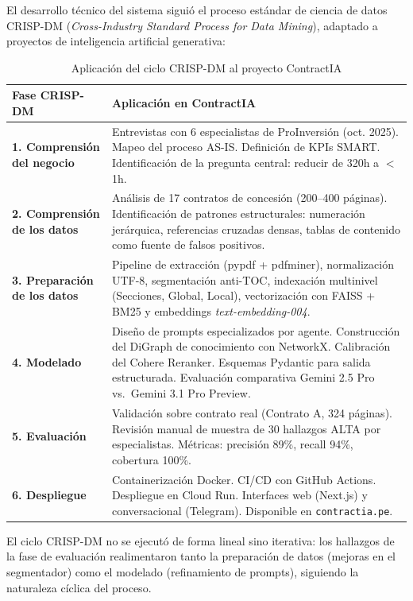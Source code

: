 El desarrollo técnico del sistema siguió el proceso estándar de ciencia de
datos CRISP-DM (\textit{Cross-Industry Standard Process for Data Mining}),
adaptado a proyectos de inteligencia artificial generativa:

\begin{table}[H]
\centering
\caption{Aplicación del ciclo CRISP-DM al proyecto ContractIA}
\label{tab:crispdm}
\begin{tabular}{p{4cm}p{9.5cm}}
\toprule
\textbf{Fase CRISP-DM} & \textbf{Aplicación en ContractIA} \\
\midrule
\textbf{1. Comprensión del negocio} &
Entrevistas con 6 especialistas de ProInversión (oct. 2025). Mapeo del
proceso AS-IS. Definición de KPIs SMART. Identificación de la pregunta
central: reducir de 320h a $<$1h. \\
\midrule
\textbf{2. Comprensión de los datos} &
Análisis de 17 contratos de concesión (200--400 páginas). Identificación
de patrones estructurales: numeración jerárquica, referencias cruzadas
densas, tablas de contenido como fuente de falsos positivos. \\
\midrule
\textbf{3. Preparación de los datos} &
Pipeline de extracción (pypdf + pdfminer), normalización UTF-8,
segmentación anti-TOC, indexación multinivel (Secciones, Global,
Local), vectorización con FAISS + BM25 y embeddings
\textit{text-embedding-004}. \\
\midrule
\textbf{4. Modelado} &
Diseño de prompts especializados por agente. Construcción del DiGraph
de conocimiento con NetworkX. Calibración del Cohere Reranker.
Esquemas Pydantic para salida estructurada. Evaluación comparativa
Gemini 2.5 Pro vs.\ Gemini 3.1 Pro Preview. \\
\midrule
\textbf{5. Evaluación} &
Validación sobre contrato real (Contrato A, 324 páginas).
Revisión manual de muestra de 30 hallazgos ALTA por especialistas.
Métricas: precisión 89\%, recall 94\%, cobertura 100\%. \\
\midrule
\textbf{6. Despliegue} &
Containerización Docker. CI/CD con GitHub Actions. Despliegue en
Cloud Run. Interfaces web (Next.js) y conversacional (Telegram).
Disponible en \texttt{contractia.pe}. \\
\bottomrule
\end{tabular}
\end{table}

El ciclo CRISP-DM no se ejecutó de forma lineal sino iterativa: los hallazgos
de la fase de evaluación realimentaron tanto la preparación de datos (mejoras
en el segmentador) como el modelado (refinamiento de prompts), siguiendo la
naturaleza cíclica del proceso.

